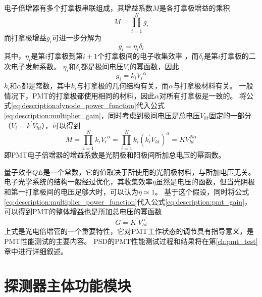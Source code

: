 电子倍增器有多个打拿极串联组成，其增益系数$M$是各打拿极增益的乘积
\begin{equation}
M = \prod_{i=1}^{N} g_{i}
\label{eq:description:multiplier_gain}
\end{equation}
而打拿极增益$g_i$可进一步分解为
\begin{equation}
g_{i} = \eta_{i} \delta_{i}
\end{equation}
其中，$\eta_{i}$是第$i$打拿极到第$i+1$个打拿极间的电子收集效率 ，而$\delta_i$是第$i$打拿极的二次电子发射系数。
$\eta_{i}$和$\delta_i$都是极间电压$V_i$的幂函数，因此
\begin{equation}
g_{i} = k_i {V_i}^\alpha
\label{eq:description:dynode_power_function}
\end{equation}
$k_i$和$\alpha$都是常数，其中$k_i$与打拿极的几何结构有关，而$\alpha$与打拿极材料有关。
一般情况下，PMT的打拿极都使用相同的材料，因此$\alpha$对所有打拿极是一致的。
将公式\ref{eq:description:dynode_power_function}代入公式\ref{eq:description:multiplier_gain}，同时考虑到极间电压是总电压$V_{ht}$固定的一部分（$V_i=k^{'}V_{ht}$），可以得到
\begin{equation}
M = \prod_{i=1}^{N} k_i{V_i}^\alpha = \prod_{i=1}^{N} k_i{(k^{'}_i V_{ht})}^\alpha = KV_{ht}^{N\alpha}
\label{eq:description:multiplier_power_function}
\end{equation}
即PMT电子倍增器的增益系数是光阴极和阳极间所加总电压的幂函数。

量子效率$QE$是一个常数，它的值取决于所使用的光阴极材料，与所加电压无关。
电子光学系统的结构一般经过优化，其收集效率$\eta$虽然是电压的函数，但当光阴极和第一打拿极间的电压足够大时，可以认为$\eta\simeq1$。
基于这个假设，同时将公式\ref{eq:description:multiplier_power_function}代入公式\ref{eq:description:pmt_gain}，可以得到PMT的整体增益也是所加总电压的幂函数
\begin{equation}
G = K^{'} V_{ht}^{{\alpha}^{'}}
\label{eq:description:pmt_gain_power_function}
\end{equation}
上式是光电倍增管的一个重要特性，它对PMT工作状态的调节具有指导意义，是PMT性能测试的主要内容。
PSD的PMT性能测试过程和结果将在第\ref{ch:pmt_test}章中进行详细叙述。


\section{探测器主体功能模块}

